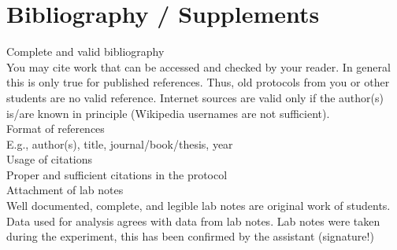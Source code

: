 \documentclass[30pt,a4paper]{article}
\begin{document}
	\section{Bibliography / Supplements}
	Complete and valid bibliography\\
	You may cite work that can be accessed and checked by your reader. In general this is only true for
	published references. Thus, old protocols from you or other students are no valid reference. Internet
	sources are valid only if the author(s) is/are known in principle (Wikipedia usernames are not sufficient).\\
	Format of references\\
	E.g., author(s), title, journal/book/thesis, year\\
	Usage of citations\\
	Proper and sufficient citations in the protocol\\
	Attachment of lab notes\\
	Well documented, complete, and legible lab notes are original work of students. Data used for analysis
	agrees with data from lab notes. Lab notes were taken during the experiment, this has been confirmed by
	the assistant (signature!)
\end{document}
